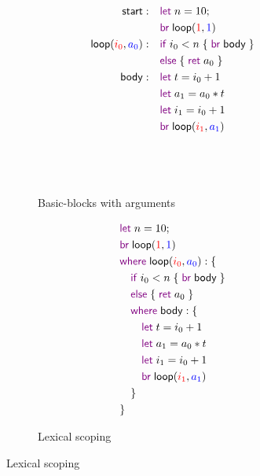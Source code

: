 \documentclass[acmsmall,screen,review]{acmart}
\newcommand{\ms}[1]{\ensuremath{\mathsf{#1}}}
\newcommand{\kwms}[1]{\textcolor{violet}{\ms{#1}}}
\newcommand{\lbms}[1]{{\ms{#1}}}
\begin{document}
\begin{figure}
  \begin{subfigure}[t]{.35\textwidth}
    \centering
    \begin{adjustbox}{minipage=1.2\textwidth,scale=0.8}
    \begin{align*}
      \lbms{start}:\quad            & \kwms{let}\;n = 10; \\
                                    & \kwms{br}\;
                                        \lbms{loop}(\textcolor{red}{1}, \textcolor{blue}{1}) \\
      \lbms{loop}(\textcolor{red}{i_0}, \textcolor{blue}{a_0}): \quad  
                                    & \kwms{if}\;i_0 < n\; \{\;\kwms{br}\;\lbms{body}\;\} \\
                                    & \kwms{else}\;\{\;\kwms{ret}\;a_0\;\} \\
      \lbms{body}: \quad            & \kwms{let}\;t = i_0 + 1 \\
                                    & \kwms{let}\;a_1 = a_0 * t \\
                                    & \kwms{let}\;i_1 = i_0 + 1 \\
                                    & \kwms{br}\;\lbms{loop}
                                      (\textcolor{red}{i_1}, \textcolor{blue}{a_1}) 
                                    \\ \\ \\ \\
    \end{align*}
    \end{adjustbox}
    \caption{Basic-blocks with arguments}
    \label{fig:fact-bba}
  \end{subfigure}%
  \begin{subfigure}[t]{.3\textwidth}
    \begin{adjustbox}{minipage=\linewidth,scale=0.8}
    \begin{align*}
      & \kwms{let}\;n = 10; \\
      & \kwms{br}\;\lbms{loop}(\textcolor{red}{1}, \textcolor{blue}{1}) \\
      & \kwms{where}\;\lbms{loop}(\textcolor{red}{i_0}, \textcolor{blue}{a_0}): \{ \\
      & \quad \kwms{if}\;i_0 < n\;\{\;\kwms{br}\;\lbms{body}\;\} \\
      & \quad \kwms{else}\;\{\;\kwms{ret}\;a_0\;\} \\
      & \quad \kwms{where}\;\lbms{body}: \{\\ 
      & \qquad \kwms{let}\;t = i_0 + 1 \\
      & \qquad \kwms{let}\;a_1 = a_0 * t \\
      & \qquad \kwms{let}\;i_1 = i_0 + 1 \\
      & \qquad \kwms{br}\;\lbms{loop}(\textcolor{red}{i_1}, \textcolor{blue}{a_1})  \\
      & \quad \} \\
      & \}
    \end{align*}
    \end{adjustbox}
    \caption{Lexical scoping}
    \label{fig:fact-lex}
  \end{subfigure}
  

\end{figure}
\end{document}

